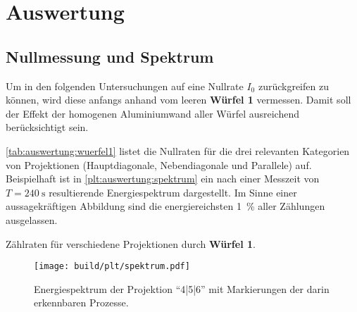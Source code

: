 \section{Auswertung}
\label{sec:auswertung}

\subsection{Nullmessung und Spektrum}

Um in den folgenden Untersuchungen auf eine Nullrate $I_0$ zurückgreifen zu können,
wird diese anfangs anhand vom leeren \textbf{Würfel 1} vermessen.
Damit soll der Effekt der homogenen Aluminiumwand aller Würfel ausreichend berücksichtigt sein.

\autoref{tab:auswertung:wuerfel1} listet die Nullraten für die drei relevanten Kategorien von Projektionen
(Hauptdiagonale, Nebendiagonale und Parallele)
auf.
Beispielhaft ist in \autoref{plt:auswertung:spektrum} ein nach einer Messzeit von $T = \SI{240}{\second}$ resultierende Energiespektrum dargestellt.
Im Sinne einer aussagekräftigen Abbildung sind die energiereichsten \SI{1}{\percent} aller Zählungen ausgelassen.

\begin{table}[H]
    \centering
    \caption{Zählraten für verschiedene Projektionen durch \textbf{Würfel 1}.}
    \label{tab:auswertung:wuerfel1}
\end{table}

\begin{figure}
    \centering
    \texttt{[image: build/plt/spektrum.pdf]}
    \caption{Energiespektrum der Projektion \enquote{4|5|6} mit Markierungen der darin erkennbaren Prozesse.}
    \label{plt:auswertung:spektrum}
\end{figure}


